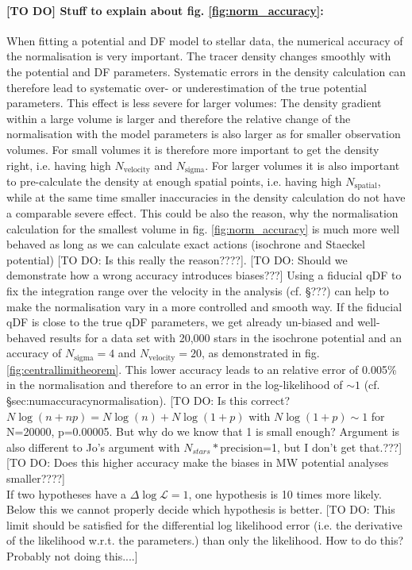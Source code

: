 \paragraph{[TO DO] Stuff to explain about fig. \ref{fig:norm_accuracy}:} When fitting a potential and DF model to stellar data, the numerical accuracy of the normalisation is very important. The tracer density changes smoothly with the potential and DF parameters. Systematic errors in the density calculation can therefore lead to systematic over- or underestimation of the true potential parameters. This effect is less severe for larger volumes: The density gradient within a large volume is larger and therefore the relative change of the normalisation with the model parameters is also larger as for smaller observation volumes. For small volumes it is therefore more important to get the density right, i.e. having high $N_\text{velocity}$ and $N_\text{sigma}$. For larger volumes it is also important to pre-calculate the density at enough spatial points, i.e. having high $N_\text{spatial}$, while at the same time smaller inaccuracies in the density calculation do not have a comparable severe effect. This could be also the reason, why the normalisation calculation for the smallest volume in fig. \ref{fig:norm_accuracy} is much more well behaved as long as we can calculate exact actions (isochrone and Staeckel potential) [TO DO: Is this really the reason????]. [TO DO: Should we demonstrate how a wrong accuracy introduces biases???] Using a fiducial qDF to fix the integration range over the velocity in the analysis  (cf. \S ???) can help to make the normalisation vary in a more controlled and smooth way. If the fiducial qDF is close to the true qDF parameters, we get already un-biased and well-behaved results for a data set with 20,000 stars in the isochrone potential and an accuracy of $N_\text{sigma}=4$ and $N_\text{velocity}=20$, as demonstrated in fig. \ref{fig:centrallimitheorem}. This lower accuracy leads to an relative error of  0.005\% in the normalisation and therefore to an error in the log-likelihood of $\sim1$ (cf. \S{sec:numaccuracynormalisation}). [TO DO: Is this correct? $N \log(n+np) = N\log(n) + N\log(1+p)$ with $N\log(1+p)\sim 1$ for N=20000, p=0.00005. But why do we know that 1 is small enough? Argument is also different to Jo's argument with $N_{stars}*$precision=1, but I don't get that.???]  [TO DO: Does this higher accuracy make the biases in MW potential analyses smaller????]\\If two hypotheses have a $\Delta \log \mathscr{L} = 1$, one hypothesis is 10 times more likely. Below this we cannot properly decide which hypothesis is better. [TO DO: This limit should be satisfied for the differential log likelihood error (i.e. the derivative of the likelihood w.r.t. the parameters.) than only the likelihood. How to do this? Probably not doing this....]


